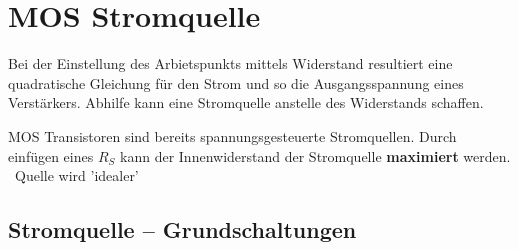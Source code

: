 \section{MOS Stromquelle}
Bei der Einstellung des Arbietspunkts mittels Widerstand resultiert eine quadratische Gleichung für den Strom und so die Ausgangsspannung eines Verstärkers.
Abhilfe kann eine Stromquelle anstelle des Widerstands schaffen.

MOS Transistoren sind bereits spannungsgesteuerte Stromquellen.
Durch einfügen eines $R_S$ kann der Innenwiderstand der Stromquelle \textbf{maximiert} werden. \textrightarrow\ Quelle wird 'idealer'

\subsection{Stromquelle -- Grundschaltungen}


